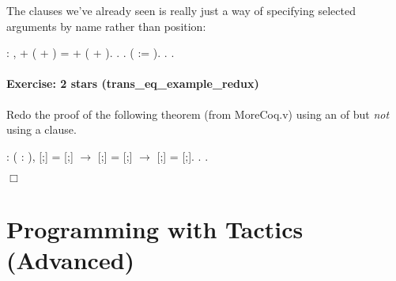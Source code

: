 \documentclass[12pt]{report}
\begin{document}
  The  clauses we've already seen is really just a way of
  specifying selected arguments by name rather than position:  \begin{coqdoccode}
\coqdocemptyline
\coqdocnoindent
{}  : \coqdockw{\ensuremath{\forall}}   ,  + ( + ) =  + ( + ).\coqdoceol
\coqdocnoindent
{}.\coqdoceol
\coqdocindent{1.00em}
   .\coqdoceol
\coqdocindent{1.00em}
   ( := ).\coqdoceol
\coqdocindent{1.00em}
. .\coqdoceol
\coqdocemptyline
\end{coqdoccode}
\paragraph{Exercise: 2 stars (trans\_eq\_example\_redux)}

 Redo the proof of the following theorem (from MoreCoq.v) using
an  of  but \textit{not} using a  clause. \begin{coqdoccode}
\coqdocemptyline
\coqdocnoindent
{}  : \coqdockw{\ensuremath{\forall}} (      : ),\coqdoceol
\coqdocindent{2.50em}
[;] = [;] \ensuremath{\rightarrow}\coqdoceol
\coqdocindent{2.50em}
[;] = [;] \ensuremath{\rightarrow}\coqdoceol
\coqdocindent{2.50em}
[;] = [;].\coqdoceol
\coqdocnoindent
{}.\coqdoceol
 .\coqdoceol
\end{coqdoccode}
\ensuremath{\Box} \begin{coqdoccode}
\coqdocemptyline
\end{coqdoccode}
\section{Programming with Tactics (Advanced)}
\end{document}
